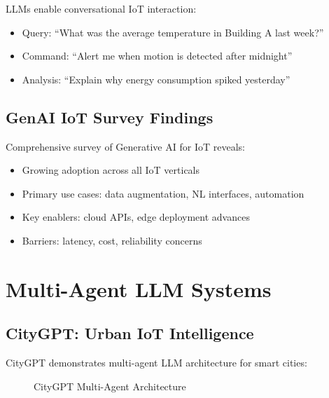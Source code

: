 \documentclass[12pt,a4paper]{article}
\begin{document}
LLMs enable conversational IoT interaction:
\begin{itemize}
    \item Query: ``What was the average temperature in Building A last week?''
    \item Command: ``Alert me when motion is detected after midnight''
    \item Analysis: ``Explain why energy consumption spiked yesterday''
\end{itemize}

\subsection{GenAI IoT Survey Findings}

Comprehensive survey of Generative AI for IoT reveals:
\begin{itemize}
    \item Growing adoption across all IoT verticals
    \item Primary use cases: data augmentation, NL interfaces, automation
    \item Key enablers: cloud APIs, edge deployment advances
    \item Barriers: latency, cost, reliability concerns
\end{itemize}

\section{Multi-Agent LLM Systems}

\subsection{CityGPT: Urban IoT Intelligence}

CityGPT demonstrates multi-agent LLM architecture for smart cities:

\begin{figure}[H]
\centering
{}
\caption{CityGPT Multi-Agent Architecture}
\end{figure}
\end{document}
